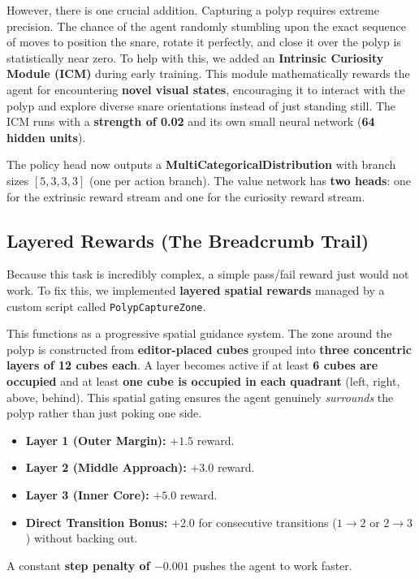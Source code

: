 However, there is one crucial addition. Capturing a polyp requires extreme precision. The chance of the agent randomly stumbling upon the exact sequence of moves to position the snare, rotate it perfectly, and close it over the polyp is statistically near zero. To help with this, we added an \textbf{Intrinsic Curiosity Module (ICM)} during early training. This module mathematically rewards the agent for encountering \textbf{novel visual states}, encouraging it to interact with the polyp and explore diverse snare orientations instead of just standing still. The ICM runs with a \textbf{strength of 0.02} and its own small neural network (\textbf{64 hidden units}).

The policy head now outputs a \textbf{MultiCategoricalDistribution} with branch sizes $[5, 3, 3, 3]$ (one per action branch). The value network has \textbf{two heads}: one for the extrinsic reward stream and one for the curiosity reward stream.

\subsection{Layered Rewards (The Breadcrumb Trail)}
Because this task is incredibly complex, a simple pass/fail reward just would not work. To fix this, we implemented \textbf{layered spatial rewards} managed by a custom script called \texttt{PolypCaptureZone}.

This functions as a progressive spatial guidance system. The zone around the polyp is constructed from \textbf{editor-placed cubes} grouped into \textbf{three concentric layers of 12 cubes each}. A layer becomes active if at least \textbf{6 cubes are occupied} and at least \textbf{one cube is occupied in each quadrant} (left, right, above, behind). This spatial gating ensures the agent genuinely \textit{surrounds} the polyp rather than just poking one side.

\begin{itemize}
    \item \textbf{Layer 1 (Outer Margin):} $+1.5$ reward.
    \item \textbf{Layer 2 (Middle Approach):} $+3.0$ reward.
    \item \textbf{Layer 3 (Inner Core):} $+5.0$ reward.
    \item \textbf{Direct Transition Bonus:} $+2.0$ for consecutive transitions ($1 \rightarrow 2$ or $2 \rightarrow 3$) without backing out.
\end{itemize}

A constant \textbf{step penalty of $-0.001$} pushes the agent to work faster. 

